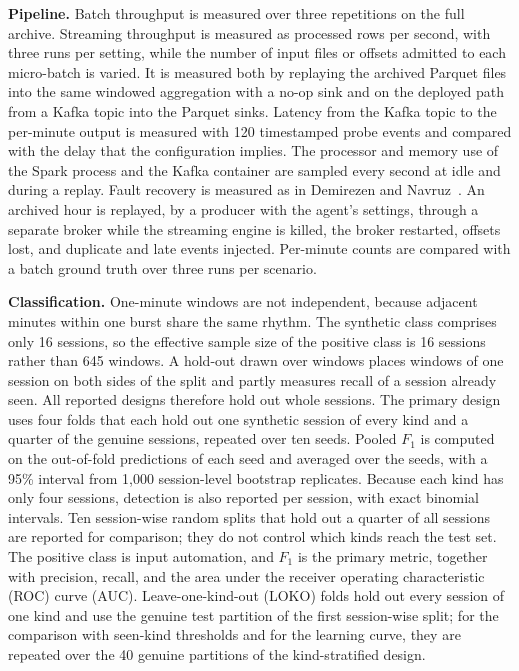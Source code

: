 \documentclass[sensors,article,submit,pdftex,oneauthor]{Definitions/mdpi}
\begin{document}
\textbf{Pipeline.} Batch throughput is measured over three repetitions on the full archive. Streaming throughput is measured as processed rows per second, with three runs per setting, while the number of input files or offsets admitted to each micro-batch is varied. It is measured both by replaying the archived Parquet files into the same windowed aggregation with a no-op sink and on the deployed path from a Kafka topic into the Parquet sinks. Latency from the Kafka topic to the per-minute output is measured with 120 timestamped probe events and compared with the delay that the configuration implies. The processor and memory use of the Spark process and the Kafka container are sampled every second at idle and during a replay. Fault recovery is measured as in Demirezen and Navruz~\cite{demirezen2023lambda}. An archived hour is replayed, by a producer with the agent's settings, through a separate broker while the streaming engine is killed, the broker restarted, offsets lost, and duplicate and late events injected. Per-minute counts are compared with a batch ground truth over three runs per scenario.

\textbf{Classification.} One-minute windows are not independent, because adjacent minutes within one burst share the same rhythm. The synthetic class comprises only 16 sessions, so the effective sample size of the positive class is 16 sessions rather than 645 windows. A hold-out drawn over windows places windows of one session on both sides of the split and partly measures recall of a session already seen. All reported designs therefore hold out whole sessions. The primary design uses four folds that each hold out one synthetic session of every kind and a quarter of the genuine sessions, repeated over ten seeds. Pooled $F_1$ is computed on the out-of-fold predictions of each seed and averaged over the seeds, with a 95\% interval from 1,000 session-level bootstrap replicates. Because each kind has only four sessions, detection is also reported per session, with exact binomial intervals. Ten session-wise random splits that hold out a quarter of all sessions are reported for comparison; they do not control which kinds reach the test set. The positive class is input automation, and $F_1$ is the primary metric, together with precision, recall, and the area under the receiver operating characteristic (ROC) curve (AUC). Leave-one-kind-out (LOKO) folds hold out every session of one kind and use the genuine test partition of the first session-wise split; for the comparison with seen-kind thresholds and for the learning curve, they are repeated over the 40 genuine partitions of the kind-stratified design.
\end{document}
